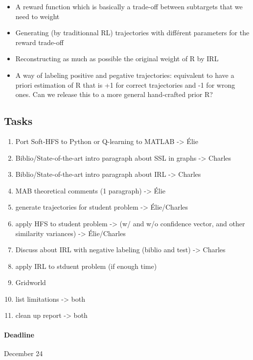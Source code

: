 \documentclass{article}
\begin{document}
\begin{itemize}
    \item A reward function which is basically a trade-off between subtargets that we need to weight
    \item Generating (by traditionnal RL) trajectories with différent parameters for the reward trade-off
    \item Reconstructing as much as possible the original weight of R by IRL
    \item A way of labeling positive and pegative trajectories: equivalent to have a priori estimation of R that is +1 for correct trajectories and -1 for wrong ones. Can we release this to a more general hand-crafted prior R?
\end{itemize}




\begin{appendices}
\section{Tasks}

\begin{enumerate}
    \item Port Soft-HFS to Python or Q-learning to MATLAB -> Élie
    \item Biblio/State-of-the-art intro paragraph about SSL in graphs -> Charles
    \item Biblio/State-of-the-art intro paragraph about IRL -> Charles
    \item MAB theoretical comments (1 paragraph) -> Élie
    \item generate trajectories for student problem -> Élie/Charles
    \item apply HFS to student problem -> (w/ and w/o confidence vector, and other similarity variances) -> Élie/Charles
    \item Discuss about IRL with negative labeling (biblio and test) -> Charles
    \item apply IRL to stduent problem (if enough time)
    \item Gridworld
    \item list limitations -> both
    \item clean up report -> both
\end{enumerate}

\paragraph{Deadline} December 24

\end{appendices}
\end{document}
